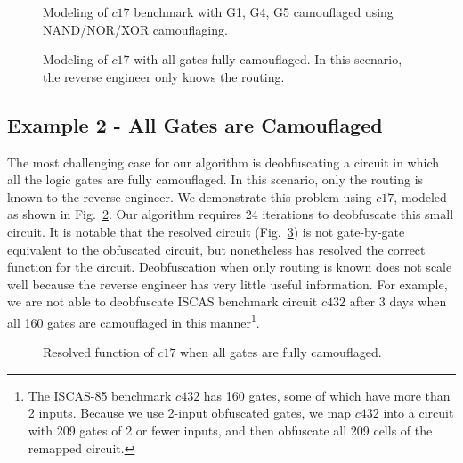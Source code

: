 \documentclass[proposal]{umassthesis}  %
\begin{document}
\begin{figure}[!htb] 
\begin{center}
\caption{Modeling of $c17$ benchmark with G1, G4, G5 camouflaged using NAND/NOR/XOR camouflaging.}
\label{fig:c17_mux2}
\end{center}
\end{figure}

\begin{figure}[!htb] 
\begin{center}
\caption{Modeling of $c17$ with all gates fully camouflaged. In this scenario, the reverse engineer only knows the routing.}
\label{fig:c17_mux4}
\end{center}
\end{figure}



\subsection{Example 2 - All Gates are Camouflaged}

The most challenging case for our algorithm is deobfuscating a circuit in which all the logic gates are fully camouflaged. In this scenario, only the routing is known to the reverse engineer. We demonstrate this problem using $c17$, modeled as shown in Fig.~\ref{fig:c17_mux4}. Our algorithm requires 24 iterations to deobfuscate this small circuit. It is notable that the resolved circuit (Fig.~\ref{fig:c17_all}) is not gate-by-gate equivalent to the obfuscated circuit, but nonetheless has resolved the correct function for the circuit. Deobfuscation when only routing is known does not scale well because the reverse engineer has very little useful information. For example, we are not able to deobfuscate ISCAS benchmark circuit $c432$ after 3 days when all 160 gates are camouflaged in this manner\footnote{The ISCAS-85 benchmark $c432$ has 160 gates, some of which have more than 2 inputs. Because we use 2-input obfuscated gates, we map $c432$ into a circuit with 209 gates of 2 or fewer inputs, and then obfuscate all 209 cells of the remapped circuit.}.


\begin{figure}[htb] 
\begin{center}
\caption{Resolved function of $c17$ when all gates are fully camouflaged.}
\label{fig:c17_all}
\end{center}
\end{figure}
\end{document}

